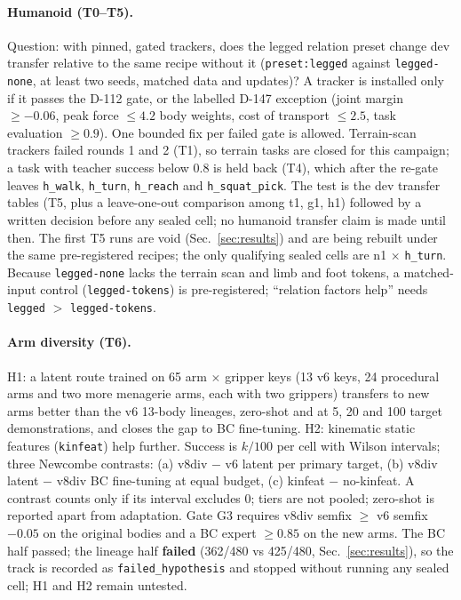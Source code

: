 \documentclass[10pt,twocolumn]{article}
\begin{document}
\paragraph{Humanoid (T0--T5).} Question: with pinned, gated trackers, does the legged relation preset change dev transfer relative to the same recipe without it (\texttt{preset:legged} against \texttt{legged-none}, at least two seeds, matched data and updates)? A tracker is installed only if it passes the D-112 gate, or the labelled D-147 exception (joint margin $\ge-0.06$, peak force $\le4.2$ body weights, cost of transport $\le2.5$, task evaluation $\ge0.9$). One bounded fix per failed gate is allowed. Terrain-scan trackers failed rounds 1 and 2 (T1), so terrain tasks are closed for this campaign; a task with teacher success below 0.8 is held back (T4), which after the re-gate leaves \texttt{h\_walk}, \texttt{h\_turn}, \texttt{h\_reach} and \texttt{h\_squat\_pick}. The test is the dev transfer tables (T5, plus a leave-one-out comparison among t1, g1, h1) followed by a written decision before any sealed cell; no humanoid transfer claim is made until then. The first T5 runs are void (Sec.~\ref{sec:results}) and are being rebuilt under the same pre-registered recipes; the only qualifying sealed cells are n1 $\times$ \texttt{h\_turn}. Because \texttt{legged-none} lacks the terrain scan and limb and foot tokens, a matched-input control (\texttt{legged-tokens}) is pre-registered; ``relation factors help'' needs \texttt{legged} $>$ \texttt{legged-tokens}.

\paragraph{Arm diversity (T6).} H1: a latent route trained on 65 arm $\times$ gripper keys (13 v6 keys, 24 procedural arms and two more menagerie arms, each with two grippers) transfers to new arms better than the v6 13-body lineages, zero-shot and at 5, 20 and 100 target demonstrations, and closes the gap to BC fine-tuning. H2: kinematic static features (\texttt{kinfeat}) help further. Success is $k/100$ per cell with Wilson intervals; three Newcombe contrasts: (a) v8div $-$ v6 latent per primary target, (b) v8div latent $-$ v8div BC fine-tuning at equal budget, (c) kinfeat $-$ no-kinfeat. A contrast counts only if its interval excludes 0; tiers are not pooled; zero-shot is reported apart from adaptation. Gate G3 requires v8div semfix $\ge$ v6 semfix $-0.05$ on the original bodies and a BC expert $\ge0.85$ on the new arms. The BC half passed; the lineage half \textbf{failed} (362/480 vs 425/480, Sec.~\ref{sec:results}), so the track is recorded as \texttt{failed\_hypothesis} and stopped without running any sealed cell; H1 and H2 remain untested.
\end{document}
